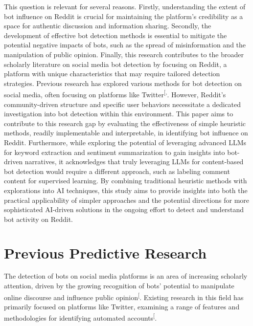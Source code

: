 \documentclass[
  12pt,
  letterpaper,
  DIV=11,
  numbers=noendperiod]{scrartcl}
\begin{document}
This question is relevant for several reasons. Firstly, understanding
the extent of bot influence on Reddit is crucial for maintaining the
platform's credibility as a space for authentic discussion and
information sharing. Secondly, the development of effective bot
detection methods is essential to mitigate the potential negative
impacts of bots, such as the spread of misinformation and the
manipulation of public opinion. Finally, this research contributes to
the broader scholarly literature on social media bot detection by
focusing on Reddit, a platform with unique characteristics that may
require tailored detection strategies. Previous research has explored
various methods for bot detection on social media, often focusing on
platforms like
Twitter\textsuperscript{{[},\citeproc{ref-multibotdetector}{4}{]}}.
However, Reddit's community-driven structure and specific user behaviors
necessitate a dedicated investigation into bot detection within this
environment. This paper aims to contribute to this research gap by
evaluating the effectiveness of simple heuristic methods, readily
implementable and interpretable, in identifying bot influence on Reddit.
Furthermore, while exploring the potential of leveraging advanced LLMs
for keyword extraction and sentiment summarization to gain insights into
bot-driven narratives, it acknowledges that truly leveraging LLMs for
content-based bot detection would require a different approach, such as
labeling comment content for supervised learning. By combining
traditional heuristic methods with explorations into AI techniques, this
study aims to provide insights into both the practical applicability of
simpler approaches and the potential directions for more sophisticated
AI-driven solutions in the ongoing effort to detect and understand bot
activity on Reddit.

\section{Previous Predictive
Research}\label{previous-predictive-research}

The detection of bots on social media platforms is an area of increasing
scholarly attention, driven by the growing recognition of bots'
potential to manipulate online discourse and influence public
opinion\textsuperscript{{[}\citeproc{ref-multibotdetector}{4}{]}}.
Existing research in this field has primarily focused on platforms like
Twitter, examining a range of features and methodologies for identifying
automated
accounts\textsuperscript{{[}\citeproc{ref-redditbotwatch}{3}{]}}.
\end{document}
